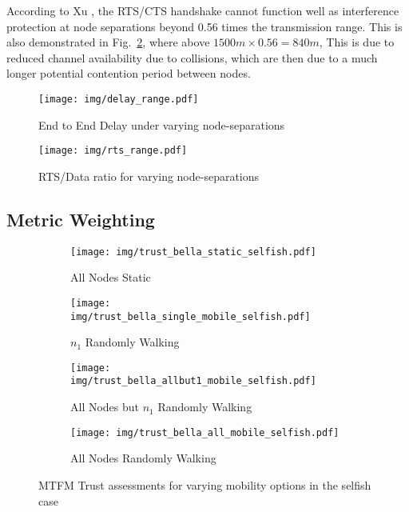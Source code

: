 According to Xu \cite{Xu2002}, the RTS/CTS handshake cannot function well as interference protection at node separations beyond 0.56 times the transmission range. 
This is also demonstrated in  Fig.~\ref{fig:rts_range}, where above $1500m \times 0.56 = 840m$, 
This is due to reduced channel availability due to collisions, which are then due to a much longer potential contention period between nodes. 

\begin{figure}[H]
  \centering
  \texttt{[image: img/delay\_range.pdf]}
  \caption{End to End Delay under varying node-separations}
  \label{fig:delay_range}
\end{figure}

\begin{figure}[H]
  \centering
  \texttt{[image: img/rts\_range.pdf]}
  \caption{RTS/Data ratio for varying node-separations}
  \label{fig:rts_range}
\end{figure}


\begin{table}[H]
  \caption{Tabular view of data from Figs~\ref{fig:prod_breakdown_range}, \ref{fig:delay_range}, and \ref{fig:rts_range}} \label{tab:rangedelay}
  \begin{center}
      
  \end{center}
\end{table}



\subsection{Metric Weighting}
\begin{figure}
\begin{subfigure}{.5\textwidth}
  \centering
  \texttt{[image: img/trust\_bella\_static\_selfish.pdf]}
  \caption{All Nodes Static}
  \label{fig:selfish_trust_static}
\end{subfigure}%
\begin{subfigure}{.5\textwidth}
  \centering
  \texttt{[image: img/trust\_bella\_single\_mobile\_selfish.pdf]}
  \caption{$n_1$ Randomly Walking}
  \label{fig:selfish_trust_single}
\end{subfigure}
\begin{subfigure}{.5\textwidth}
\centering
  \texttt{[image: img/trust\_bella\_allbut1\_mobile\_selfish.pdf]}
  \caption{All Nodes but $n_1$ Randomly Walking}
  \label{fig:selfish_trust_allbut1}
\end{subfigure}
\begin{subfigure}{.5\textwidth}
\centering
  \texttt{[image: img/trust\_bella\_all\_mobile\_selfish.pdf]}
  \caption{All Nodes Randomly Walking}
  \label{fig:selfish_trust_all_mobile}
\end{subfigure}
\caption{MTFM Trust assessments for varying mobility options in the selfish case}
\label{fig:trust_mobility}
\end{figure}




